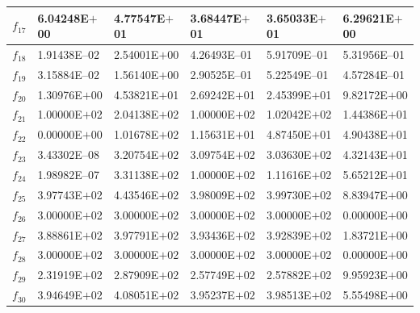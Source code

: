 \documentclass[graybox]{svmult}
\begin{document}
\begin{table}[!ht]
{\begin{tabular}{p{1cm}p{2.5cm}p{2.5cm}p{2.5cm}p{2.5cm}p{2.5cm}}
		$f_{17}$ & 6.04248E$+$00 & 4.77547E$+$01 & 3.68447E$+$01 & 3.65033E$+$01 & 6.29621E$+$00 \\ \hline
		$f_{18}$ & 1.91438E--02 & 2.54001E$+$00 & 4.26493E--01 & 5.91709E--01 & 5.31956E--01 \\ \hline
		$f_{19}$ & 3.15884E--02 & 1.56140E$+$00 & 2.90525E--01 & 5.22549E--01 & 4.57284E--01 \\ \hline
		$f_{20}$ & 1.30976E$+$00 & 4.53821E$+$01 & 2.69242E$+$01 & 2.45399E$+$01 & 9.82172E$+$00 \\ \hline
		$f_{21}$ & 1.00000E$+$02 & 2.04138E$+$02 & 1.00000E$+$02 & 1.02042E$+$02 & 1.44386E$+$01 \\ \hline
		$f_{22}$ & 0.00000E$+$00 & 1.01678E$+$02 & 1.15631E$+$01 & 4.87450E$+$01 & 4.90438E$+$01 \\ \hline
		$f_{23}$ & 3.43302E--08 & 3.20754E$+$02 & 3.09754E$+$02 & 3.03630E$+$02 & 4.32143E$+$01 \\ \hline
		$f_{24}$ & 1.98982E--07 & 3.31138E$+$02 & 1.00000E$+$02 & 1.11616E$+$02 & 5.65212E$+$01 \\ \hline
		$f_{25}$ & 3.97743E$+$02 & 4.43546E$+$02 & 3.98009E$+$02 & 3.99730E$+$02 & 8.83947E$+$00 \\ \hline
		$f_{26}$ & 3.00000E$+$02 & 3.00000E$+$02 & 3.00000E$+$02 & 3.00000E$+$02 & 0.00000E$+$00 \\ \hline
		$f_{27}$ & 3.88861E$+$02 & 3.97791E$+$02 & 3.93436E$+$02 & 3.92839E$+$02 & 1.83721E$+$00 \\ \hline
		$f_{28}$ & 3.00000E$+$02 & 3.00000E$+$02 & 3.00000E$+$02 & 3.00000E$+$02 & 0.00000E$+$00 \\ \hline
		$f_{29}$ & 2.31919E$+$02 & 2.87909E$+$02 & 2.57749E$+$02 & 2.57882E$+$02 & 9.95923E$+$00 \\ \hline
		$f_{30}$ & 3.94649E$+$02 & 4.08051E$+$02 & 3.95237E$+$02 & 3.98513E$+$02 & 5.55498E$+$00 \\ \hline
	\end{tabular}
}
\end{table}
\end{document}

